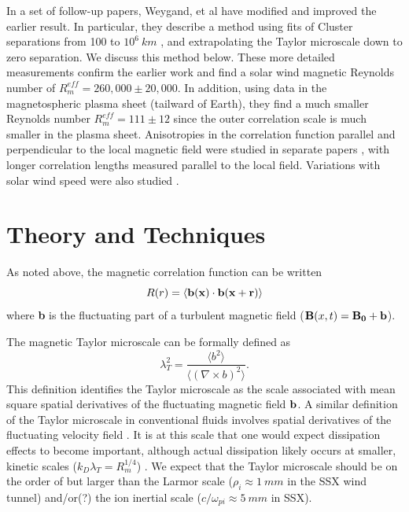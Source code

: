 \documentclass[aip,prl,amsmath,amssymb,reprint,superscriptaddress]{revtex4-1} %
\begin{document}
In a set of follow-up papers, Weygand, et al \cite{Weygand07,Weygand09,Weygand10,Weygand11} have modified and improved the earlier result.  In particular, they describe a method using fits of Cluster separations from 100 to $10^6~km$ \cite{Weygand07}, and extrapolating the Taylor microscale down to zero separation.  We discuss this method below.  These more detailed measurements confirm the earlier work  \cite{Matthaeus05} and find a solar wind magnetic Reynolds number of $R_m^{eff}  = 260,000 \pm 20,000$.  In addition, using data in the magnetospheric plasma sheet (tailward of Earth), they find a much smaller Reynolds number $R_m^{eff}  = 111 \pm 12$ since the outer correlation scale is much smaller in the plasma sheet.  Anisotropies in the correlation function parallel and perpendicular to the local magnetic field were studied in separate papers \cite{Weygand09,Weygand10}, with longer correlation lengths measured parallel to the local field.  Variations with solar wind speed were also studied \cite{Weygand11}.


\section{Theory and Techniques}

As noted above, the magnetic correlation function can be written
%
\begin{equation}
R(r) =  \langle {\bf b(x) \cdot b(x + r)} \rangle
\end{equation}
%
where {\bf b} is the fluctuating part of a turbulent magnetic field (${\bf B}(x, t) = {\bf B_0 + b}$). 

The magnetic Taylor microscale can be formally defined as
%
\begin{equation}
\lambda_T^2 = \frac{\langle b^2 \rangle}{\langle (\nabla \times b)^2 \rangle}.
\label{eq:tayscale}
\end{equation}
%
This definition identifies the Taylor microscale as the scale associated with mean square spatial derivatives of the fluctuating magnetic field $\bf{b}$. A similar definition of the Taylor microscale in conventional fluids involves spatial derivatives of the fluctuating velocity field \cite{frisch95}. It is at this scale that one would expect dissipation effects to become important, although actual dissipation likely occurs at smaller, kinetic scales ($k_D \lambda_T = R_m^{1/4}$) \cite{Matthaeus08}.  We expect that the Taylor microscale should be on the order of but larger than the Larmor scale ($\rho_i \approx 1~mm$ in the SSX wind tunnel) and/or(?) the ion inertial scale ($c/\omega_{pi} \approx 5~mm$ in SSX).
\end{document}
